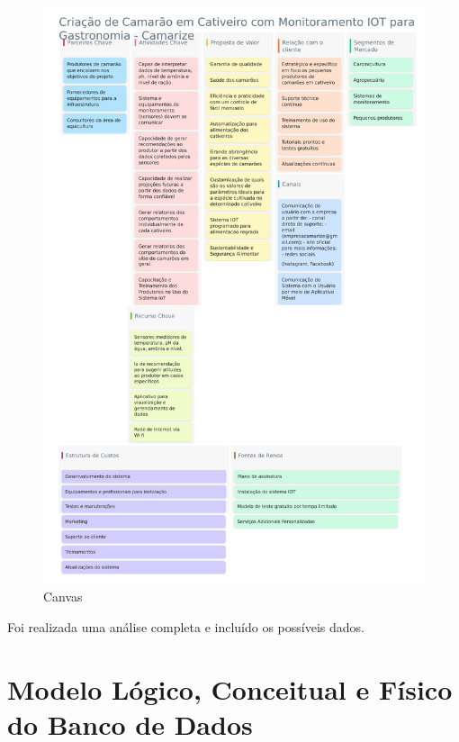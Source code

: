 \documentclass[
  a4paper,
  12pt,
  english,
  brazilian,
]{article}
\begin{document}
    
\begin{figure}[h]
\centering
\caption{Canvas}%
\label{fig:canvasum}
 \includegraphics[width = 0.8\CaptionWidth]{Imagem/Canvas.png}
\end{figure}

\newpage

Foi realizada uma análise completa e incluído os possíveis dados.

\section*{\textbf{Modelo Lógico, Conceitual e Físico do Banco de Dados}}
\end{document}
